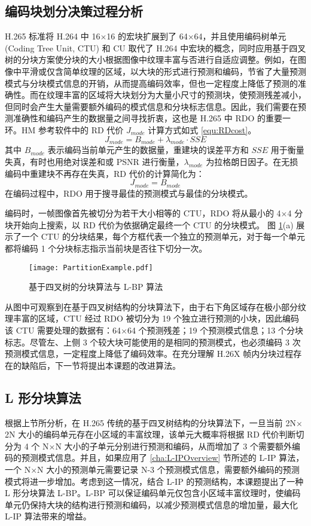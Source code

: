 \subsection{编码块划分决策过程分析}
H.265 标准将 H.264 中 16$\times$16 的宏块扩展到了 64$\times$64，并且使用编码树单元 (Coding Tree Unit, CTU) 和 CU 取代了 H.264 中宏块的概念，同时应用基于四叉树的分块方案使分块的大小根据图像中纹理丰富与否进行自适应调整。例如，在图像中平滑或仅含简单纹理的区域，以大块的形式进行预测和编码，节省了大量预测模式与分块模式信息的开销，从而提高编码效率，但也一定程度上降低了预测的准确性。而在纹理丰富的区域将大块划分为大量小尺寸的预测块，使预测残差减小，但同时会产生大量需要额外编码的模式信息和分块标志信息。因此，我们需要在预测准确性和编码产生的数据量之间寻找折衷，这也是 H.265 中 RDO 的重要一环。HM 参考软件中的 RD 代价 $J_{mode}$ 计算方式如式 \ref{equ:RDcost}。
\begin{equation}
    J_{mode}=B_{mode}+\lambda_{mode}\cdot SSE
    \label{equ:RDcost}
\end{equation}
其中 $B_{mode}$ 表示编码当前单元产生的数据量，重建块的误差平方和 $SSE$ 用于衡量失真，有时也用绝对误差和或 PSNR 进行衡量，$\lambda_{mode}$ 为拉格朗日因子。在无损编码中重建块不再存在失真，RD 代价的计算简化为：
\begin{equation}
    J_{mode}=B_{mode}
\end{equation}
在编码过程中，RDO 用于搜寻最佳的预测模式与最佳的分块模式。

编码时，一帧图像首先被切分为若干大小相等的 CTU，RDO 将从最小的 4$\times$4 分块开始向上搜索，以 RD 代价为依据确定最终一个 CTU 的分块模式。
图 \ref{fig:PartitionExample}(a) 展示了一个 CTU 的分块结果，每个方框代表一个独立的预测单元，对于每一个单元都将编码 1 个分块标志指示当前块是否往下切分一次。
\begin{figure}[hbt]
    \centering
    \texttt{[image: PartitionExample.pdf]}
    \caption{基于四叉树的分块算法与 L-BP 算法}
    \label{fig:PartitionExample}
\end{figure}
从图中可观察到在基于四叉树结构的分块算法下，由于右下角区域存在极小部分纹理丰富的区域，CTU 经过 RDO 被切分为 19 个独立进行预测的小块，因此编码该 CTU 需要处理的数据有：64$\times$64 个预测残差；19 个预测模式信息；13 个分块标志。尽管左、上侧 3 个较大块可能使用的是相同的预测模式，也必须编码 3 次预测模式信息，一定程度上降低了编码效率。在充分理解 H.26X 帧内分块过程存在的缺陷后，下一节将提出本课题的改进算法。

\subsection{L 形分块算法}
根据上节所分析，在 H.265 传统的基于四叉树结构的分块算法下，一旦当前 2N$\times$2N 大小的编码单元存在小区域的丰富纹理，该单元大概率将根据 RD 代价判断切分为 4 个 N$\times$N 大小的子单元分别进行预测和编码，从而增加了 3 个需要额外编码的预测模式信息。并且，如果应用了 \ref{cha:L-IPOverview} 节所述的 L-IP 算法，一个 N$\times$N 大小的预测单元需要记录 N-3 个预测模式信息，需要额外编码的预测模式将进一步增加。考虑到这一情况，结合 L-IP 的预测结构，本课题提出了一种 L 形分块算法 L-BP。L-BP 可以保证编码单元仅包含小区域丰富纹理时，使编码单元仍保持大块的结构进行预测和编码，以减少预测模式信息的增加量，最大化 L-IP 算法带来的增益。


